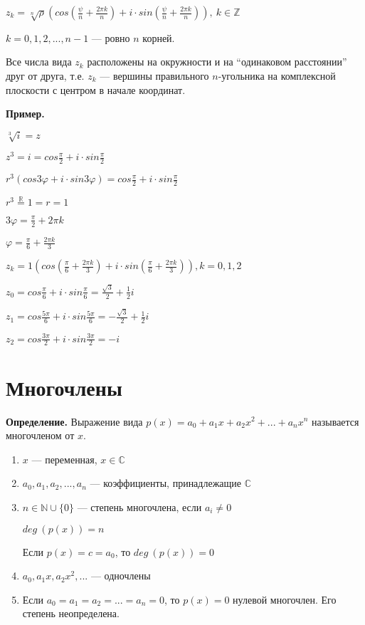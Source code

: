 \documentclass{article}
\begin{document}
    \(z_k = \sqrt[n]{\rho}(cos(\frac{\psi}{n}+\frac{2\pi k}{n})+i\cdot sin(\frac{\psi}{n}+\frac{2\pi k}{n})),\ k \in \mathbb{Z}\)

    \( k = 0, 1, 2, ..., n - 1 \) --- ровно \(n\) корней.

    Все числа вида \(z_k\) расположены на окружности и на ``одинаковом расстоянии'' друг от друга, т.е. \(z_k\) --- вершины правильного \(n\)-угольника на комплексной плоскости с центром в начале координат.

    \textbf{Пример.}
    
    \(\sqrt[3]{i} = z\)

    \(z^3 = i = cos\frac{\pi}{2} + i\cdot sin\frac{\pi}{2}\)

    \(r^3(cos 3\varphi + i\cdot sin 3\varphi) = cos\frac{\pi}{2} + i\cdot sin\frac{\pi}{2}\)

    \(r^3 \stackrel{\mathbb{R}}{=} 1 = r = 1\)

    \(3\varphi = \frac{\pi}{2} + 2\pi k\)

    \(\varphi = \frac{\pi}{6} + \frac{2\pi k}{3}\)

    \( z_k = 1(cos(\frac{\pi}{6} + \frac{2\pi k}{3}) + i\cdot sin(\frac{\pi}{6} + \frac{2\pi k}{3})), k = 0, 1, 2 \)

    \(z_0 = cos\frac{\pi}{6} + i\cdot sin\frac{\pi}{6} = \frac{\sqrt{3}}{2}+\frac{1}{2}i\)

    \(z_1 = cos\frac{5\pi}{6} + i\cdot sin\frac{5\pi}{6} = -\frac{\sqrt{3}}{2} + \frac{1}{2}i \)
    
    \(z_2 = cos\frac{3\pi}{2} + i\cdot sin\frac{3\pi}{2} = -i\)
    
    \section{Многочлены}

    \textbf{Определение.} Выражение вида \( p(x) = a_0 + a_1x + a_2x^2 + ... + a_nx^n \) называется многочленом от \(x\).
    
    \begin{enumerate}
        \item \( x \) --- переменная, \( x \in \mathbb{C} \)
        \item \( a_0, a_1, a_2, ..., a_n \) --- коэффициенты, принадлежащие \( \mathbb{C} \)
        \item \( n \in \mathbb{N} \cup \{0\}\) --- степень многочлена, если \(a_i \neq 0\) 
        
        \( deg\ (p(x)) = n \)

        Если \( p(x) = c = a_0 \), то \(deg\ (p(x)) = 0\) 
        
        \item \(a_0, a_1x, a_2x^2, ...\) --- одночлены
        \item Если \( a_0 = a_1 = a_2 = ... = a_n = 0 \), то \( p(x) = 0 \) нулевой многочлен. Его степень неопределена.
    \end{enumerate}
    
\end{document}
